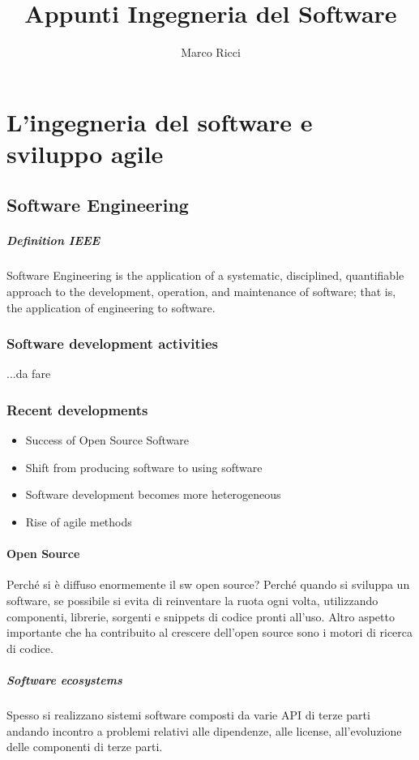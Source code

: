 \documentclass[10pt,a4paper]{book}
\author{Marco Ricci}
\title{Appunti Ingegneria del Software}
\begin{document}
\tableofcontents
\newpage
\chapter{L'ingegneria del software e sviluppo agile}
\section{Software Engineering}
\paragraph{Definition IEEE} Software Engineering is the application of a systematic, disciplined, quantifiable approach to the development, operation, and maintenance of software; that is, the application of engineering to software.

\subsection{Software development activities}
...da fare

\subsection{Recent developments}
\begin{itemize}
\item Success of Open Source Software
\item Shift from producing software to using software
\item Software development becomes more heterogeneous
\item Rise of agile methods
\end{itemize}

\subsubsection{Open Source}
Perché si è diffuso enormemente il sw open source? Perché quando si sviluppa un software, se possibile si evita di reinventare la ruota ogni volta, utilizzando componenti, librerie, sorgenti e snippets di codice pronti all'uso.
Altro aspetto importante che ha contribuito al crescere dell'open source sono i motori di ricerca di codice.

\paragraph{Software ecosystems} Spesso si realizzano sistemi software composti da varie API di terze parti andando incontro a problemi relativi alle dipendenze, alle license, all'evoluzione delle componenti di terze parti.
\end{document}
